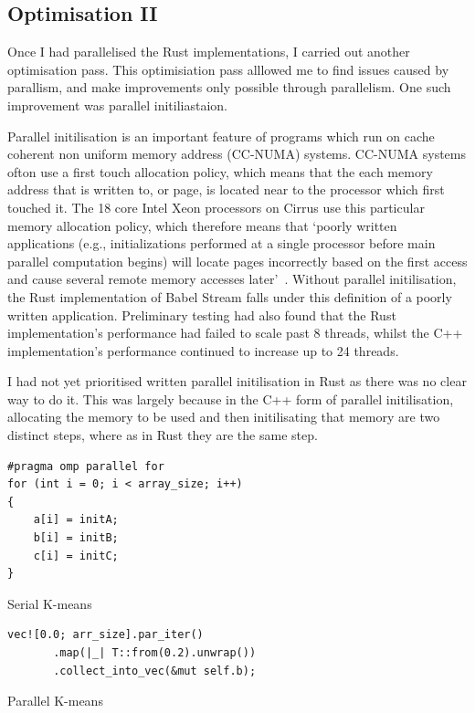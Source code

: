 \subsection{Optimisation II}
Once I had parallelised the Rust implementations, I carried out another optimisation pass. This optimisiation pass alllowed me to find issues caused by parallism, and make improvements only possible through parallelism. One such improvement was parallel initiliastaion.

Parallel initilisation is an important feature of programs which run on cache coherent non uniform memory address (CC-NUMA) systems. CC-NUMA systems ofton use a first touch allocation policy, which means that the each memory address that is written to, or page, is located near to the processor which first touched it. The 18 core Intel Xeon processors on Cirrus use this particular memory allocation policy, which therefore means that `poorly written applications (e.g., initializations  performed  at  a  single  processor  before  main  parallel computation  begins)  will  locate  pages  incorrectly based  on  the  first  access  and  cause  several  remote memory accesses later'~\cite{Bhuyan:2000}. Without parallel initilisation, the Rust implementation of Babel Stream falls under this definition of a poorly written application. Preliminary testing had also found that the Rust implementation's performance had failed to scale past 8 threads, whilst the C++ implementation's performance continued to increase up to 24 threads. 

I had not yet prioritised written parallel initilisation in Rust as there was no clear way to do it. This was largely because in the C++ form of parallel initilisation, allocating the memory to be used and then initilisating that memory are two distinct steps, where as in Rust they are the same step.

\noindent\begin{minipage}{.48\textwidth}
\begin{listing}[H]
\begin{verbatim}
#pragma omp parallel for
for (int i = 0; i < array_size; i++)
{
    a[i] = initA;
    b[i] = initB;
    c[i] = initC;
}
\end{verbatim}
\label{lst:serialInit}
\caption{Serial K-means}
\end{listing}
\end{minipage}\hfill
\begin{minipage}{.48\textwidth}
\begin{listing}[H]
\begin{verbatim}
vec![0.0; arr_size].par_iter()
       .map(|_| T::from(0.2).unwrap())
       .collect_into_vec(&mut self.b);
\end{verbatim}
\label{lst:parInit}
\caption{Parallel K-means}
\end{listing}
\end{minipage}

